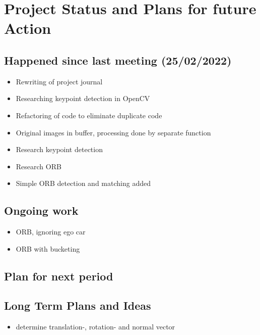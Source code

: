 \chapter{Project Status and Plans for future Action}

\section{Happened since last meeting (25/02/2022)}
\begin{itemize}
    \item Rewriting of project journal
    \item Researching keypoint detection in OpenCV
    \item Refactoring of code to eliminate duplicate code
    \item Original images in buffer, processing done by separate function
    \item Research keypoint detection
    \item Research ORB
    \item Simple ORB detection and matching added
\end{itemize}
\section{Ongoing work}
\begin{itemize}
    \item ORB, ignoring ego car
    \item ORB with bucketing
\end{itemize}
\section{Plan for next period}

\section{Long Term Plans and Ideas}
\begin{itemize}
    \item determine translation-, rotation- and normal vector
\end{itemize}